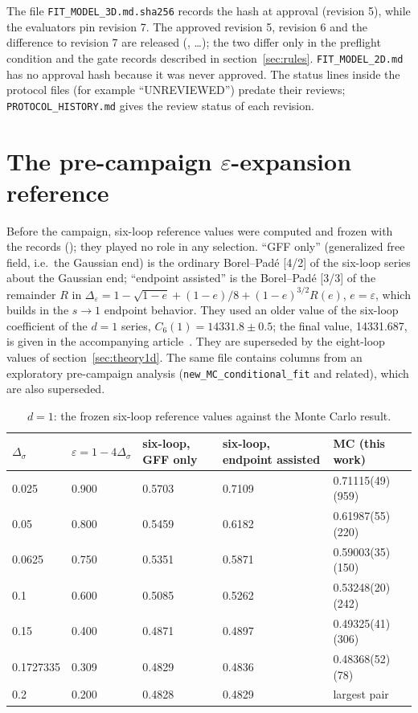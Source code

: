 \documentclass[10pt,a4paper]{article}
\newcommand{\Ds}{\Delta_\sigma}
\newcommand{\De}{\Delta_\varepsilon}
\newcommand{\code}[1]{\texttt{#1}}
\begin{document}
The file \code{FIT\_MODEL\_3D.md.sha256} records the hash at approval (revision 5), while the evaluators pin revision 7. The approved revision 5,
revision 6 and the difference to revision 7 are released (, \dots); the two differ only in
the preflight condition and the gate records described in section~\ref{sec:rules}. \code{FIT\_MODEL\_2D.md} has no approval hash because it
was never approved. The status lines inside the protocol files (for example ``UNREVIEWED'') predate their reviews; \code{PROTOCOL\_HISTORY.md}
gives the review status of each revision.

\section{\texorpdfstring{The pre-campaign $\varepsilon$-expansion reference}{The pre-campaign epsilon-expansion reference}}\label{app:eps}
Before the campaign, six-loop reference values were computed and frozen with the records
(); they played no role in any selection. ``GFF only'' (generalized free field, i.e.\ the Gaussian end) is the ordinary
Borel--Pad\'e [4/2] of the six-loop series about the Gaussian end; ``endpoint assisted'' is the Borel--Pad\'e [3/3] of the remainder $R$ in
$\De=1-\sqrt{1-e}+(1-e)/8+(1-e)^{3/2}R(e)$, $e=\varepsilon$, which builds in the $s\to1$ endpoint behavior. They used an older value of the six-loop coefficient of the $d=1$ series, $C_6(1)=14331.8\pm0.5$; the final value, 14331.687, is given in the
accompanying article~\cite{Zheng:2026ai}. They are superseded by the eight-loop values of section~\ref{sec:theory1d}. The same
file contains columns from an exploratory pre-campaign analysis (\code{new\_MC\_conditional\_fit} and related), which are also superseded.
\begin{table}[htbp]\centering\small
\caption{$d=1$: the frozen six-loop reference values against the Monte Carlo result.}\label{tab:eps}
\begin{tabular}{@{}lllll@{}}\toprule
$\Ds$ & $\varepsilon=1-4\Ds$ & six-loop, GFF only & six-loop, endpoint assisted & MC (this work) \\\midrule
0.025 & 0.900 & 0.5703 & 0.7109 & 0.71115(49)(959) \\
0.05 & 0.800 & 0.5459 & 0.6182 & 0.61987(55)(220) \\
0.0625 & 0.750 & 0.5351 & 0.5871 & 0.59003(35)(150) \\
0.1 & 0.600 & 0.5085 & 0.5262 & 0.53248(20)(242) \\
0.15 & 0.400 & 0.4871 & 0.4897 & 0.49325(41)(306) \\
0.1727335 & 0.309 & 0.4829 & 0.4836 & 0.48368(52)(78) \\
0.2 & 0.200 & 0.4828 & 0.4829 & largest pair \\
\bottomrule\end{tabular}
\end{table}
\end{document}
